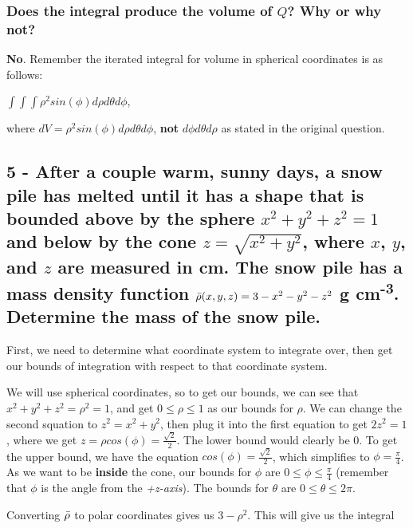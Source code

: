 \documentclass{article}
\begin{document}
\subsubsection{Does the integral produce the volume of $Q$?  Why or why not?}
\par\noindent\large \textbf{No}.  Remember the iterated integral for volume in spherical coordinates is as follows:
\par\noindent\Large $\int\int\int \rho^{2}sin(\phi)d\rho d\theta d\phi$, 
\par\noindent\large where $dV = \rho^{2}sin(\phi)d\rho d\theta d\phi$, \textbf{not} $d\phi d\theta d\rho$ as stated in the original question.

\subsection{5 - After a couple warm, sunny days, a snow pile has melted until it has a shape that is bounded above by the sphere $x^{2} + y^{2} + z^{2} = 1$ and below by the cone $z = \sqrt{x^{2} + y^{2}}$, where $x$, $y$, and $z$ are measured in cm.  The snow pile has a mass density function $\Bar{\rho}(x, y, z) = 3 - x^{2} - y^{2} - z^{2}$ g cm\textsuperscript{-3}.  Determine the mass of the snow pile.}

\par\noindent\large First, we need to determine what coordinate system to integrate over, then get our bounds of integration with respect to that coordinate system.\vspace{0.25cm}

\par\noindent\large We will use spherical coordinates, so to get our bounds, we can see that $x^{2} + y^{2} + z^{2} = \rho^{2} = 1$, and get $0 \leq \rho \leq 1$ as our bounds for $\rho$.  We can change the second squation to $z^{2} = x^{2} + y^{2}$, then plug it into the first equation to get $2z^{2} = 1$, where we get $z = \rho cos(\phi) = \frac{\sqrt{2}}{2}$.  The lower bound would clearly be 0.  To get the upper bound, we have the equation $cos(\phi) = \frac{\sqrt
2}{2}$, which simplifies to $\phi = \frac{\pi}{4}$.  As we want to be \textbf{inside} the cone, our bounds for $\phi$ are $0 \leq \phi \leq \frac{\pi}{4}$ (remember that $\phi$ is the angle from the \textit{+z-axis}). The bounds for $\theta$ are $0 \leq \theta \leq 2\pi$.\vspace{0.25cm}

\par\noindent\large Converting $\Bar{\rho}$ to polar coordinates gives us $3 - \rho^{2}$.  This will give us the integral
\end{document}
